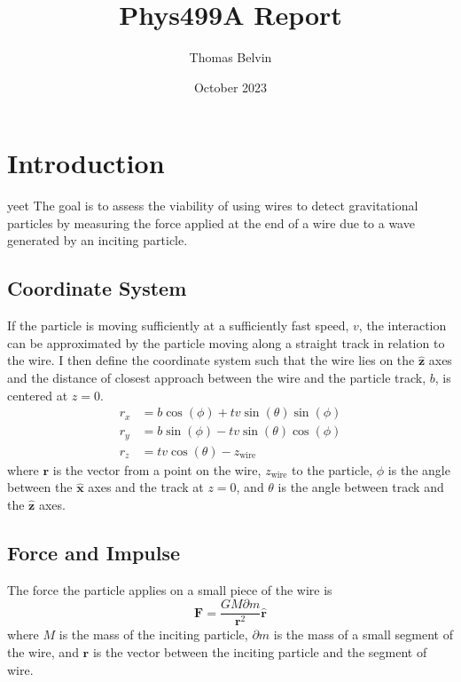 \documentclass{report}
\title{Phys499A Report}
\author{Thomas Belvin}
\date{October 2023}
\begin{document}
\maketitle
\chapter*{Introduction}
yeet
The goal is to assess the viability of using wires to detect gravitational particles 
by measuring the force applied at the end of a wire due to a wave generated by an inciting
particle.
\section*{Coordinate System}
If the particle is moving sufficiently at a sufficiently fast speed, $v$, the interaction can be approximated by the 
particle moving along a straight track in relation to the wire. I then define the coordinate system
such that the wire lies on the $\mathbf{\hat z}$ axes and the distance of closest approach between the 
wire and the particle track, $b$, is centered at $z = 0$. 
\begin{align}
    r_x &= b \cos (\phi )+t v \sin (\theta ) \sin (\phi )\\
    r_y &= b \sin (\phi )-t v \sin (\theta ) \cos (\phi )\\
    r_z &= t v \cos (\theta )-z_{\text{wire}}
\end{align}
where $\mathbf{r}$ is the vector from a point on the wire, $z_{\text{wire}}$ to the particle, $\phi$ is the angle between
the $\mathbf{\hat x}$ axes and the track at $z = 0$, and $\theta$ is the angle between track and the $\mathbf{\hat z}$ axes.
\section*{Force and Impulse}
The force the particle applies on a small piece of the wire is
\begin{equation}
    \mathbf{F} = \frac{G M \partial m}{\mathbf{r}^2} \mathbf{\hat r}
\end{equation}
where $M$ is the mass of the inciting particle, $\partial m$ is the mass of a small segment of the wire,
and $\mathbf{r}$ is the vector between the inciting particle and the segment of wire.
\end{document}
